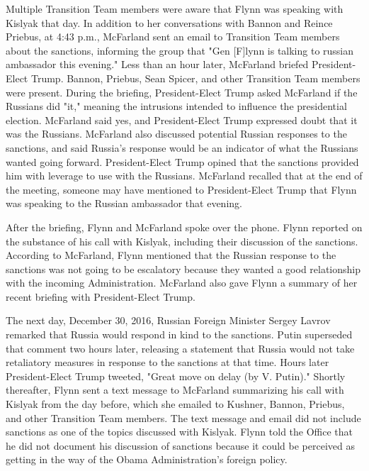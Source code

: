Multiple Transition Team members were aware that Flynn was speaking with Kislyak that day.
In addition to her conversations with Bannon and Reince Priebus, at 4:43 p.m., McFarland sent an email to Transition Team members about the sanctions, informing the group that "Gen [F]lynn is talking to russian ambassador this evening."%
Less than an hour later, McFarland briefed President-Elect Trump.
Bannon, Priebus, Sean Spicer, and other Transition Team members were present.%
During the briefing, President-Elect Trump asked McFarland if the Russians did "it," meaning the intrusions intended to influence the presidential election.%
McFarland said yes, and President-Elect Trump expressed doubt that it was the Russians.%
McFarland also discussed potential Russian responses to the sanctions, and said Russia's response would be an indicator of what the Russians wanted going forward.%
President-Elect Trump opined that the sanctions provided him with leverage to use with the Russians.%
McFarland recalled that at the end of the meeting, someone may have mentioned to President-Elect Trump that Flynn was speaking to the Russian ambassador that evening.%

After the briefing, Flynn and McFarland spoke over the phone.%
Flynn reported on the substance of his call with Kislyak, including their discussion of the sanctions.%
According to McFarland, Flynn mentioned that the Russian response to the sanctions was not going to be escalatory because they wanted a good relationship with the incoming Administration.%
McFarland also gave Flynn a summary of her recent briefing with President-Elect Trump.%

The next day, December 30, 2016, Russian Foreign Minister Sergey Lavrov remarked that Russia would respond in kind to the sanctions.%
Putin superseded that comment two hours later, releasing a statement that Russia would not take retaliatory measures in response to the sanctions at that time.%
Hours later President-Elect Trump tweeted, "Great move on delay (by V. Putin)."%
Shortly thereafter, Flynn sent a text message to McFarland summarizing his call with Kislyak from the day before, which she emailed to Kushner, Bannon, Priebus, and other Transition Team members.%
The text message and email did not include sanctions as one of the topics discussed with Kislyak.%
Flynn told the Office that he did not document his discussion of sanctions because it could be perceived as getting in the way of the Obama Administration's foreign policy.%

